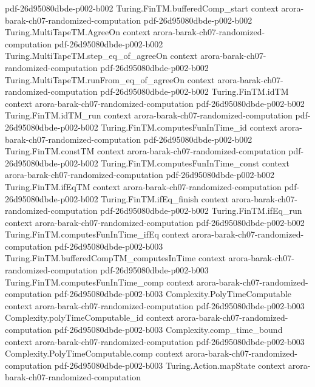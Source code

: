 \begin{theorem}
  {pdf-26d95080dbde-p002-b002}
\proofstep
  {Turing.FinTM.bufferedComp_start}
  {context}
  {arora-barak-ch07-randomized-computation}
  {pdf-26d95080dbde-p002-b002}
\proofstep
  {Turing.MultiTapeTM.AgreeOn}
  {context}
  {arora-barak-ch07-randomized-computation}
  {pdf-26d95080dbde-p002-b002}
\proofstep
  {Turing.MultiTapeTM.step_eq_of_agreeOn}
  {context}
  {arora-barak-ch07-randomized-computation}
  {pdf-26d95080dbde-p002-b002}
\proofstep
  {Turing.MultiTapeTM.runFrom_eq_of_agreeOn}
  {context}
  {arora-barak-ch07-randomized-computation}
  {pdf-26d95080dbde-p002-b002}
\proofstep
  {Turing.FinTM.idTM}
  {context}
  {arora-barak-ch07-randomized-computation}
  {pdf-26d95080dbde-p002-b002}
\proofstep
  {Turing.FinTM.idTM_run}
  {context}
  {arora-barak-ch07-randomized-computation}
  {pdf-26d95080dbde-p002-b002}
\proofstep
  {Turing.FinTM.computesFunInTime_id}
  {context}
  {arora-barak-ch07-randomized-computation}
  {pdf-26d95080dbde-p002-b002}
\proofstep
  {Turing.FinTM.constTM}
  {context}
  {arora-barak-ch07-randomized-computation}
  {pdf-26d95080dbde-p002-b002}
\proofstep
  {Turing.FinTM.computesFunInTime_const}
  {context}
  {arora-barak-ch07-randomized-computation}
  {pdf-26d95080dbde-p002-b002}
\proofstep
  {Turing.FinTM.ifEqTM}
  {context}
  {arora-barak-ch07-randomized-computation}
  {pdf-26d95080dbde-p002-b002}
\proofstep
  {Turing.FinTM.ifEq_finish}
  {context}
  {arora-barak-ch07-randomized-computation}
  {pdf-26d95080dbde-p002-b002}
\proofstep
  {Turing.FinTM.ifEq_run}
  {context}
  {arora-barak-ch07-randomized-computation}
  {pdf-26d95080dbde-p002-b002}
\proofstep
  {Turing.FinTM.computesFunInTime_ifEq}
  {context}
  {arora-barak-ch07-randomized-computation}
  {pdf-26d95080dbde-p002-b003}
\proofstep
  {Turing.FinTM.bufferedCompTM_computesInTime}
  {context}
  {arora-barak-ch07-randomized-computation}
  {pdf-26d95080dbde-p002-b003}
\proofstep
  {Turing.FinTM.computesFunInTime_comp}
  {context}
  {arora-barak-ch07-randomized-computation}
  {pdf-26d95080dbde-p002-b003}
\proofstep
  {Complexity.PolyTimeComputable}
  {context}
  {arora-barak-ch07-randomized-computation}
  {pdf-26d95080dbde-p002-b003}
\proofstep
  {Complexity.polyTimeComputable_id}
  {context}
  {arora-barak-ch07-randomized-computation}
  {pdf-26d95080dbde-p002-b003}
\proofstep
  {Complexity.comp_time_bound}
  {context}
  {arora-barak-ch07-randomized-computation}
  {pdf-26d95080dbde-p002-b003}
\proofstep
  {Complexity.PolyTimeComputable.comp}
  {context}
  {arora-barak-ch07-randomized-computation}
  {pdf-26d95080dbde-p002-b003}
\proofstep
  {Turing.Action.mapState}
  {context}
  {arora-barak-ch07-randomized-computation}

\end{theorem}
